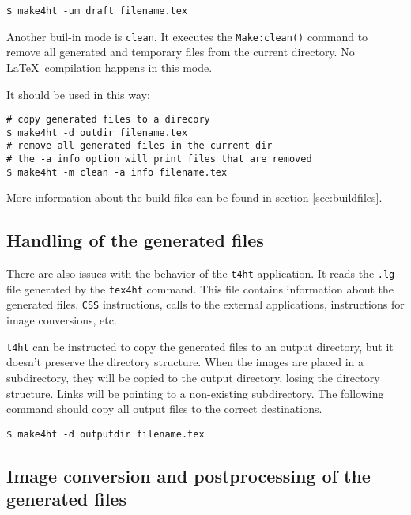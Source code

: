 \begin{verbatim}
$ make4ht -um draft filename.tex
\end{verbatim}

Another buil-in mode is \texttt{clean}. It executes the
\texttt{Make:clean()} command to remove all generated and temporary
files from the current directory. No \LaTeX~compilation happens in this
mode.

It should be used in this way:

\begin{verbatim}
# copy generated files to a direcory
$ make4ht -d outdir filename.tex 
# remove all generated files in the current dir
# the -a info option will print files that are removed
$ make4ht -m clean -a info filename.tex
\end{verbatim}

More information about the build files can be found in section
\ref{sec:buildfiles}.

\hypertarget{handling-of-the-generated-files}{%
\subsection{Handling of the generated
files}\label{handling-of-the-generated-files}}

\label{sec:output-dir}

There are also issues with the behavior of the \texttt{t4ht}
application. It reads the \texttt{.lg} file generated by the
\texttt{tex4ht} command. This file contains information about the
generated files, \texttt{CSS} instructions, calls to the external
applications, instructions for image conversions, etc.

\texttt{t4ht} can be instructed to copy the generated files to an output
directory, but it doesn't preserve the directory structure. When the
images are placed in a\\
subdirectory, they will be copied to the output directory, losing the
directory structure. Links will be pointing to a non-existing
subdirectory. The following command should copy all output files to the
correct destinations.

\begin{verbatim}
$ make4ht -d outputdir filename.tex
\end{verbatim}

\hypertarget{image-conversion-and-postprocessing-of-the-generated-files}{%
\subsection{Image conversion and postprocessing of the generated
files}\label{image-conversion-and-postprocessing-of-the-generated-files}}

